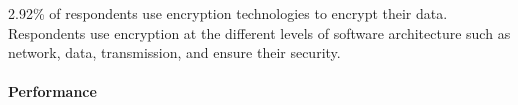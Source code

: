 2.92\% of respondents use encryption technologies to encrypt their data. Respondents use encryption at the different levels of software architecture such as network, data, transmission, and ensure their security.



\paragraph{Performance}
\label{Performance}


